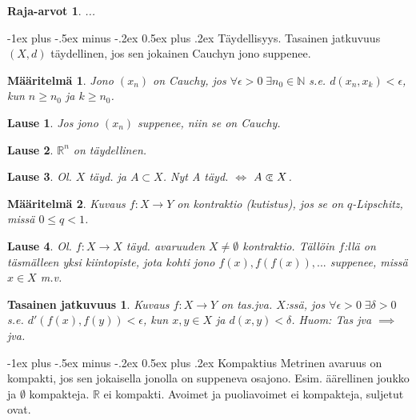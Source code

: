\documentclass[landscape,a4paper,9pt]{extarticle}
\makeatletter
\renewcommand{\section}{\@startsection{section}{1}{0mm}%
                                {-1ex plus -.5ex minus -.2ex}%
                                {0.5ex plus .2ex}%
                                {\color{blue}\normalfont\large\bfseries}}
\newcommand\cls{\mathrel{\ooalign{$\subset$\cr
\hidewidth\raise.225ex\hbox{$\text{{\scriptsize c}}\mkern2mu$}\cr}}}
\theoremstyle{customtheoremstyle}
\newtheorem*{theorem}{Lause}
\newtheorem*{definition}{Määritelmä}
\makeatother
\begin{document}
\begin{multicols*}{3}
\newtheorem*{defn:rajaarvot}{Raja-arvot}
\begin{defn:rajaarvot}
  ...
\end{defn:rajaarvot}

\section{Täydellisyys. Tasainen jatkuvuus}
$(X,d)$ täydellinen, jos sen jokainen Cauchyn jono suppenee.
\begin{definition}
  Jono $(x_n)$ on Cauchy, jos $\forall \epsilon > 0 \; \exists n_0 \in
  \mathbb{N}$ s.e. $d(x_n, x_k) < \epsilon$, kun $n \geq n_0$ ja $k \geq n_0$.
\end{definition}

\begin{theorem}
  Jos jono $(x_n)$ suppenee, niin se on Cauchy.
\end{theorem}

\begin{theorem}
  $\mathbb{R}^n$ on täydellinen.
\end{theorem}

\begin{theorem}
  Ol. $X$ täyd. ja $A \subset X$. Nyt A täyd. $\iff$ $A \cls X$.
\end{theorem}

\begin{definition}
  Kuvaus $f: X \rightarrow Y$ on kontraktio (kutistus), jos se on
  $q$-Lipschitz, missä $0 \leq q < 1$.
\end{definition}

\begin{theorem}
  Ol. $f: X \rightarrow X$ täyd. avaruuden $X \neq \emptyset$ kontraktio.
  Tällöin $f$:llä on täsmälleen yksi kiintopiste, jota kohti jono $f(x),
  f(f(x)), ...$ suppenee, missä $x \in X$ m.v.
\end{theorem}

\newtheorem*{defn:tasjva}{Tasainen jatkuvuus}
\begin{defn:tasjva}
  Kuvaus $f: X \rightarrow Y$ on tas.jva. $X$:ssä, jos $\forall \epsilon > 0 \;
  \exists \delta > 0$ s.e. $d'(f(x), f(y)) < \epsilon$, kun $x,y \in X$ ja
  $d(x,y) < \delta$. Huom: Tas jva $\implies$ jva.
\end{defn:tasjva}



\section{Kompaktius}
Metrinen avaruus on kompakti, jos sen jokaisella jonolla on suppeneva osajono.
Esim. äärellinen joukko ja $\emptyset$ kompakteja. $\mathbb{R}$ ei kompakti.
Avoimet ja puoliavoimet ei kompakteja, suljetut ovat.


\end{multicols*}
\end{document}
